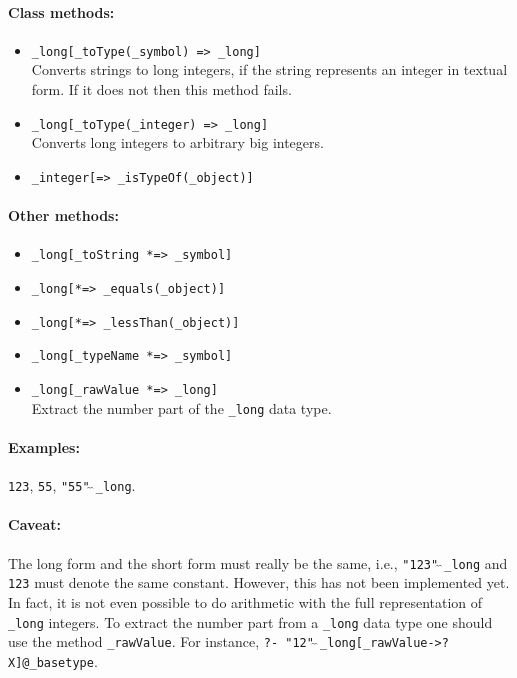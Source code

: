 \documentclass[11pt]{article}
\begin{document}
\paragraph{Class methods:}
\begin{itemize}
    \item {\tt \_long[\_toType(\_symbol) => \_long]}   \\
      Converts strings to long integers, if the string represents an integer in textual form. If it does not then this method fails.
    \item {\tt \_long[\_toType(\_integer) => \_long]}   \\
     Converts long integers to arbitrary big integers.
    \item {\tt \_integer[=> \_isTypeOf(\_object)]}  
\end{itemize}

\paragraph{Other methods:}
\begin{itemize}
\item {\tt \_long[\_toString *=> \_symbol]}  
\item {\tt \_long[*=> \_equals(\_object)]}  
\item {\tt \_long[*=> \_lessThan(\_object)]}  
\item {\tt \_long[\_typeName *=> \_symbol]}   
\item {\tt \_long[\_rawValue *=> \_long]}
  \\
  Extract the number part of the {\tt \_long} data type. 
\end{itemize}

\paragraph{Examples:} {\tt 123},  {\tt 55}, {\tt "55"$\hat{~}\hat{~}$\_long}.

\paragraph{Caveat:} The long form and the short form must really be the
same, i.e., {\tt "123"$\hat{~}\hat{~}$\_long} and {\tt 123} must denote the
same constant.  However, this has not been implemented yet.  In fact, it is
not even possible to do arithmetic with the full representation of {\tt
  \_long} 
integers. To extract the number part from a {\tt \_long}  data type one should use
the method {\tt \_rawValue}.  For instance, {\tt ?-
  "12"$\hat{~}\hat{~}$\_long[\_rawValue->?X]@\_basetype}.
\end{document}
